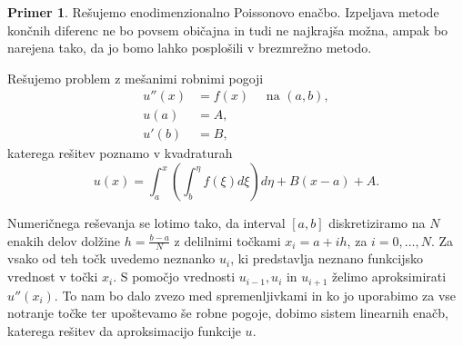 \documentclass[12pt,a4paper,twoside]{article}
\theoremstyle{definition} %
\newtheorem{primer}[definicija]{Primer}
\theoremstyle{plain} %
\numberwithin{equation}{section}
\begin{document}
\begin{primer}
\label{prim:fdm}
Rešujemo enodimenzionalno Poissonovo enačbo. Izpeljava metode končnih diferenc
ne bo povsem običajna in tudi ne najkrajša možna, ampak bo narejena tako, da
jo bomo lahko posplošili v brezmrežno metodo.

Rešujemo problem z mešanimi robnimi pogoji
\begin{align}
  u''(x) &= f(x) \quad \text{ na } (a, b), \nonumber \\
  u(a) &= A,  \label{eq:example-prob} \\
  u'(b) &= B, \nonumber
\end{align}
katerega rešitev poznamo v kvadraturah
\begin{equation}
    u(x) = \int_a^x\left(\int_b^\eta f(\xi) d\xi \right) d\eta + B(x-a) + A.
\end{equation}

Numeričnega reševanja se lotimo tako, da interval $[a, b]$ diskretiziramo na $N$ enakih delov
dolžine $h = \frac{b-a}{N}$ z delilnimi točkami $x_i = a + i h$, za $i = 0, \dots, N$. Za vsako od
teh točk uvedemo neznanko $u_i$, ki predstavlja neznano funkcijsko vrednost v točki $x_i$. S pomočjo
vrednosti $u_{i-1}, u_i$ in $u_{i+1}$ želimo aproksimirati $u''(x_i)$. To nam bo dalo zvezo
med spremenljivkami in ko jo uporabimo za vse notranje točke ter upoštevamo še robne pogoje, dobimo
sistem linearnih enačb, katerega rešitev da aproksimacijo funkcije $u$.


\end{primer}
\end{document}
